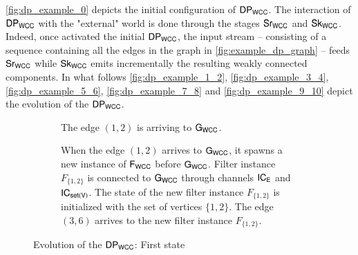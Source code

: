   \autoref{fig:dp_example_0} depicts the initial configuration of $\dpwcc$. 
  The interaction of $\dpwcc$ with the "external" world is done through the stages $\mathsf{Sr_{WCC}}$ and $\mathsf{Sk_{WCC}}$. 
  Indeed, once activated the initial $\dpwcc$, the input stream -- consisting of a sequence containing all the edges in the graph in \autoref{fig:example_dp_graph} -- feeds $\mathsf{Sr_{WCC}}$ while  $\mathsf{Sk_{WCC}}$ emits incrementally the resulting weakly connected components.  
  In what follows \autoref{fig:dp_example_1_2}, \autoref{fig:dp_example_3_4}, \autoref{fig:dp_example_5_6}, \autoref{fig:dp_example_7_8} and \autoref{fig:dp_example_9_10} depict the evolution of the $\dpwcc$.
   
  \begin{figure}[h!]
  \centering
  \begin{subfigure}[b]{\textwidth}
   \centering
    \caption{The edge $(1,2)$ is arriving to $\mathsf{G_{WCC}}$.}
    \label{fig:dp_example_1_2a}
  \end{subfigure}
  \vspace{.3cm}
  
  \begin{subfigure}[b]{\textwidth}
   \centering
    \caption{When the edge $(1,2)$ arrives to $\mathsf{G_{WCC}}$, it  spawns a new instance of $\mathsf{F_{WCC}}$ before $\mathsf{G_{WCC}}$. Filter instance $F_{\{1,2\}}$ is connected to  $\mathsf{G_{WCC}}$ through channels $\mathsf{IC_E}$ and  $\mathsf{IC_{set(V)}}$. The state of the new filter instance $F_{\{1,2\}}$ is initialized with the set of vertices $\{1,2\}$. The edge $(3,6)$ arrives to the new filter instance $F_{\{1,2\}}$.}
    \label{fig:dp_example_1_2b}
  \end{subfigure}
  \caption[{[PoC] $\dpwcc$ Evolving first state}]{Evolution of the $\dpwcc$: First state}
  \label{fig:dp_example_1_2}
  \end{figure}
  \vspace{.5cm}
  
